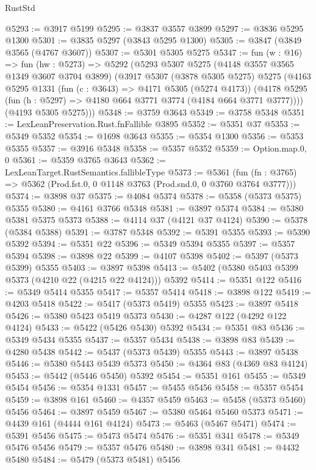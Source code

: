 \begin{lexlean}{RustStd}
\begin{coremodule}
@5293 := @3917 @5199
@5295 := @3837 @3557 @3899
@5297 := @3836 @5295 @1300
@5301 := @3835 @5297 (@3843 @5295 @1300)
@5305 := @3847 (@3849 @3565 (@4767 @3607))
@5307 := @5301 @5305 @5275
@5347 := fun (w : @16) =>
  fun (hw : @5273) =>
  @5292
    (@5293
      @5307
      @5275
      (@4148 @3557 @3565 @1349 @3607 @3704 @3899)
      (@3917
        @5307
        (@3878 @5305 @5275)
        @5275
        (@4163
          @5295
          @1331
          (fun (c : @3643) => @4171 @5305 (@5274 @4173))
          (@4178 @5295 (fun (h : @5297) => @4180 @664 @3771 @3774 (@4184 @664 @3771 @3777))))
        (@4193 @5305 @5275)))
@5348 := @3759 @3643
@5349 := @3758 @5348
@5351 := LexLeanPreservation.Rust.fnFallible @3895
@5352 := @5351 @37
@5353 := @5349 @5352
@5354 := @1698 @3643
@5355 := @5354 @1300
@5356 := @5353 @5355
@5357 := @3916 @5348
@5358 := @5357 @5352
@5359 := Option.map.{0, 0}
@5361 := @5359 @3765 @3643
@5362 := LexLeanTarget.RustSemantics.fallibleType
@5373 := @5361
    (fun (fn : @3765) => @5362 (Prod.fst.{0, 0} @1148 @3763 (Prod.snd.{0, 0} @3760 @3764 @3777)))
@5374 := @3898 @37
@5375 := @4084 @5374
@5378 := @5358 (@5373 @5375) @5355
@5380 := @4161 @3766 @5348
@5381 := @3897 @5374
@5384 := @5380 @5381 @5375 @5373
@5388 := @4114 @37 (@4121 @37 @4124)
@5390 := @5378 (@5384 @5388)
@5391 := @3787 @5348
@5392 := @5391 @5355
@5393 := @5390 @5392
@5394 := @5351 @22
@5396 := @5349 @5394 @5355
@5397 := @5357 @5394
@5398 := @3898 @22
@5399 := @4107 @5398
@5402 := @5397 (@5373 @5399) @5355
@5403 := @3897 @5398
@5413 := @5402 (@5380 @5403 @5399 @5373 (@4210 @22 (@4215 @22 @4124))) @5392
@5414 := @5351 @122
@5416 := @5349 @5414 @5355
@5417 := @5357 @5414
@5418 := @3898 @122
@5419 := @4203 @5418
@5422 := @5417 (@5373 @5419) @5355
@5423 := @3897 @5418
@5426 := @5380 @5423 @5419 @5373
@5430 := @4287 @122 (@4292 @122 @4124)
@5433 := @5422 (@5426 @5430) @5392
@5434 := @5351 @83
@5436 := @5349 @5434 @5355
@5437 := @5357 @5434
@5438 := @3898 @83
@5439 := @4280 @5438
@5442 := @5437 (@5373 @5439) @5355
@5443 := @3897 @5438
@5446 := @5380 @5443 @5439 @5373
@5450 := @4364 @83 (@4369 @83 @4124)
@5453 := @5442 (@5446 @5450) @5392
@5454 := @5351 @161
@5455 := @5349 @5454
@5456 := @5354 @1331
@5457 := @5455 @5456
@5458 := @5357 @5454
@5459 := @3898 @161
@5460 := @4357 @5459
@5463 := @5458 (@5373 @5460) @5456
@5464 := @3897 @5459
@5467 := @5380 @5464 @5460 @5373
@5471 := @4439 @161 (@4444 @161 @4124)
@5473 := @5463 (@5467 @5471)
@5474 := @5391 @5456
@5475 := @5473 @5474
@5476 := @5351 @341
@5478 := @5349 @5476 @5456
@5479 := @5357 @5476
@5480 := @3898 @341
@5481 := @4432 @5480
@5484 := @5479 (@5373 @5481) @5456

\end{coremodule}
\end{lexlean}
